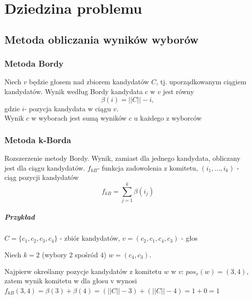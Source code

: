 \documentclass[pdflatex,11pt]{../aghdoc_version2}
\author{Tomasz Kasprzyk, Daniel Ogiela, Jakub Stępak}
\date{2016}
\begin{document}
\titlepages

\tableofcontents\thispagestyle{fancy}


\chapter{Dziedzina problemu}
\label{cha:dziedzina_problemu}

\section{Metoda obliczania wyników wyborów}
\label{sec:metoda_obliczania_wynikow_wyborow}

\subsection{Metoda Bordy}
\label{subsec:metoda_bordy}

Niech $v$ będzie głosem nad zbiorem kandydatów $C$, tj. uporządkowanym ciągiem kandydatów. Wynik według Bordy kandydata $c$ w $v$ jest równy \begin{equation}
\beta(i)=||C||-i,
\end{equation}
gdzie $i$- pozycja kandydata w ciągu $v$.\\
Wynik $c$ w wyborach jest sumą wyników $c$ u każdego z wyborców


\subsection{Metoda k-Borda}
\label{subsec:metoda_k_borda}

Rozszerzenie metody Bordy. Wynik, zamiast dla jednego kandydata, obliczany jest dla ciągu kandydatów. $f_{kB}$- funkcja zadowolenia z komitetu, $(i_1,\dots, i_k)$ - ciąg pozycji kandydatów
\begin{equation}
f_{kB}=\sum_{j=1}^{k} \beta(i_j)
\end{equation}

\paragraph{Przykład}
$C=\{c_1,c_2,c_3,c_4\}$ - zbiór kandydatów,
$v=(c_2,c_1,c_4,c_3)$ - głos

Niech $k = 2$ (wybory $2$ spośród $4$)
$w=(c_4,c_3)$.

Najpierw określamy pozycje kandydatów z komitetu $w$ w $v$:
$pos_v(w)=(3,4)$, zatem wynik komitetu w dla głosu v wynosi
$f_{kB}(3,4) = \beta(3) + \beta(4) = (||C|| - 3 ) + ( ||C|| - 4 ) = 1 + 0 = 1$
\end{document}
